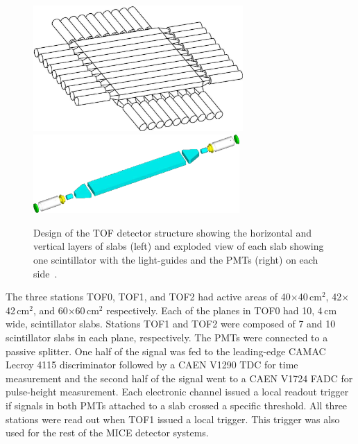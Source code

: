 
\begin{figure}[!htb]
  \centering
  \includegraphics[width=8cm]{tof_diagram2}
  \includegraphics[height=3cm]{slab_design2}
  \caption{Design of the TOF detector structure showing the horizontal and vertical layers of slabs (left) and exploded view of each slab showing one scintillator with the light-guides and the PMTs (right) on each side~\cite{NOTE145}.}
  \label{fig:tof:schematic}
\end{figure}

The three stations TOF0, TOF1, and TOF2 had active areas of
40$\times$40\,cm$^2$, 42$\times$42\,cm$^2$, and 60$\times$60\,cm$^2$
respectively.  Each of the planes in TOF0 had 10, 4\,cm wide, scintillator slabs.
Stations TOF1 and TOF2 were composed of 7 and 10 scintillator slabs in each plane, respectively.
The PMTs were connected to a passive splitter.
One half of the signal was fed to the leading-edge CAMAC Lecroy 4115 discriminator followed by a CAEN
V1290 TDC for time measurement and the second half of the signal went to a CAEN V1724 FADC for pulse-height measurement.
Each electronic channel issued a local readout trigger if signals in both PMTs attached to a
slab crossed a specific threshold. All three stations were read out when TOF1 issued a local trigger.
This trigger was also used for the rest of the MICE detector systems.



